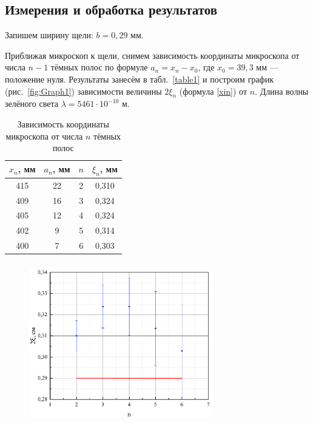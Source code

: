 \documentclass[a4paper,12pt]{article} %
\begin{document}
\subsection{Измерения и обработка результатов}

Запишем ширину щели: $ b = 0,29 $ мм. 

Приближая микроскоп к щели, снимем зависимость координаты микроскопа от числа $ n - 1 $ тёмных полос по формуле $ a_n = x_n - x_0 $, где $ x_0 = 39,3 $ мм --- положение нуля. Результаты занесём в табл.~\ref{table1}  и построим график (рис.~\ref{fig:Graph1}) зависимости величины $ 2\xi_n $ (формула \eqref{xin}) от $ n $. Длина волны зелёного света $ \lambda = 5461 \cdot 10^{-10} $ м. 

\begin{table}[h!]
	\label{table1}
	\caption{Зависимость координаты микроскопа от числа $ n $ тёмных полос}
	\begin{center}
		\begin{tabular}{|c|c|c|c|}
			\hline
			$ x_n $, мм  & $ a_n $, мм & $ n $& $ \xi_n $, мм\\
			\hline
			415&	22	&	2 & 0,310
			\\
			409&	16	&	3 &	0,324
			\\
			405&	12	&	4 &	0,324
			\\
			402&	9	&	5 & 0,314
			\\
			400&	7	&	6 &	0,303 \\
			\hline
		\end{tabular}
	\end{center}
	\label{}
\end{table}

\begin{figure}[h!]
	\begin{floatrow}
		{\includegraphics[width=8cm,height=7cm]{graph1}}         
	\end{floatrow}
\end{figure}
\end{document}
